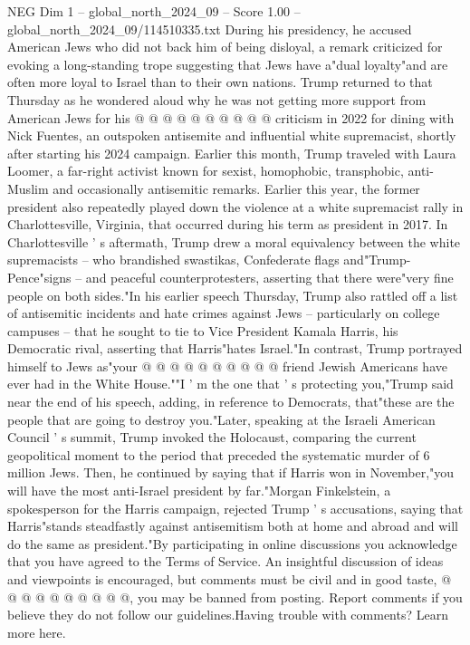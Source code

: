 \begin{textsample}{NEG Dim 1 – global\_north\_2024\_09 – Score 1.00 – global\_north\_2024\_09/114510335.txt}
During his presidency, he accused American Jews who did not back him of being disloyal, a remark criticized for evoking a long-standing trope suggesting that Jews have a"dual loyalty"and are often more loyal to Israel than to their own nations.
Trump returned to that Thursday as he wondered aloud why he was not getting more support from American Jews for his @ @ @ @ @ @ @ @ @ @ criticism in 2022 for dining with Nick Fuentes, an outspoken antisemite and influential white supremacist, shortly after starting his 2024 campaign.
Earlier this month, Trump traveled with Laura Loomer, a far-right activist known for sexist, homophobic, transphobic, anti-Muslim and occasionally antisemitic remarks.
Earlier this year, the former president also repeatedly played down the violence at a white supremacist rally in Charlottesville, Virginia, that occurred during his term as president in 2017.
In Charlottesville ' s aftermath, Trump drew a moral equivalency between the white supremacists -- who brandished swastikas, Confederate flags and"Trump-Pence"signs -- and peaceful counterprotesters, asserting that there were"very fine people on both sides."In his earlier speech Thursday, Trump also rattled off a list of antisemitic incidents and hate crimes against Jews -- particularly on college campuses -- that he sought to tie to Vice President Kamala Harris, his Democratic rival, asserting that Harris"hates Israel."In contrast, Trump portrayed himself to Jews as"your @ @ @ @ @ @ @ @ @ @ friend Jewish Americans have ever had in the White House.""I ' m the one that ' s protecting you,"Trump said near the end of his speech, adding, in reference to Democrats, that"these are the people that are going to destroy you."Later, speaking at the Israeli American Council ' s summit, Trump invoked the Holocaust, comparing the current geopolitical moment to the period that preceded the systematic murder of 6 million Jews.
Then, he continued by saying that if Harris won in November,"you will have the most anti-Israel president by far."Morgan Finkelstein, a spokesperson for the Harris campaign, rejected Trump ' s accusations, saying that Harris"stands steadfastly against antisemitism both at home and abroad and will do the same as president."By participating in online discussions you acknowledge that you have agreed to the Terms of Service.
An insightful discussion of ideas and viewpoints is encouraged, but comments must be civil and in good taste, @ @ @ @ @ @ @ @ @ @, you may be banned from posting.
Report comments if you believe they do not follow our guidelines.Having trouble with comments?
Learn more here.

\end{textsample}
